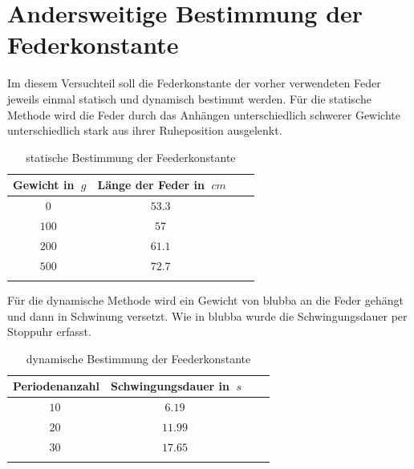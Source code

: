 \section{Andersweitige Bestimmung der Federkonstante}

Im diesem Versuchteil soll die Federkonstante der vorher verwendeten Feder jeweils einmal statisch und dynamisch bestimmt werden.
Für die statische Methode wird die Feder durch das Anhängen unterschiedlich schwerer Gewichte unterschiedlich stark aus ihrer Ruheposition ausgelenkt.

\begin{table}[h!]
    \begin{center}
        \caption{statische Bestimmung der Feederkonstante}
        \begin{tabular}{cccc}
            \hline
            Gewicht in $\SI{}{g}$ & Länge der Feder in $\SI{}{cm}$ \\
            \hline
            $\SI{0}{}$ & $\SI{53,3}{}$  \\
            $\SI{100}{}$ & $\SI{57}{}$ \\
            $\SI{200}{}$ & $\SI{61,1}{}$ \\
            $\SI{500}{}$ & $\SI{72,7}{}$ \\
            \hline
            \label{tab:Feder-statisch-Messwerte}
        \end{tabular}
    \end{center}
\end{table}

Für die dynamische Methode wird ein Gewicht von blubba an die Feder gehängt und dann in Schwinung versetzt. Wie in blubba wurde die Schwingungsdauer per Stoppuhr erfasst.

\begin{table}[h!]
    \begin{center}
        \caption{dynamische Bestimmung der Feederkonstante}
        \begin{tabular}{cccc}
            \hline
            Periodenanzahl & Schwingungsdauer in $\SI{}{s}$ \\
            \hline
            $\SI{10}{}$ & $\SI{6.19}{}$  \\
            $\SI{20}{}$ & $\SI{11.99}{}$  \\
            $\SI{30}{}$ & $\SI{17.65}{}$  \\
            
            \hline
            \label{tab:Feder-dynamisch-Messwerte}
        \end{tabular}
    \end{center}
\end{table}


